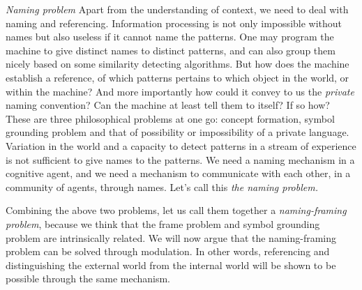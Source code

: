 {{{{{\emph{Naming problem} Apart from the understanding of context, we need to deal with naming and referencing. Information processing is not only impossible without names but also useless if it cannot name the patterns. One may program the machine to give distinct names to distinct patterns, and can also group them nicely based on some similarity detecting algorithms. But how does the machine establish a reference, of which patterns pertains to which object in the world, or within the machine? And more importantly how could it convey to us the \textit{private} naming convention?  Can the machine at least tell them to itself?  If so how? These are three philosophical problems at one go: concept formation, symbol grounding problem and that of possibility or impossibility of a private language. Variation in the world and a capacity to detect patterns in a stream of experience is not sufficient to give names to the patterns. We need a naming mechanism in a cognitive agent, and we need a mechanism to communicate with each other, in a community of agents, through names. Let's call this \textit{the naming problem.} 

Combining the above two problems, let us call them together a \textit{naming-framing problem}, because we think that the frame problem and symbol grounding problem are intrinsically related. 
We will now argue that the naming-framing problem can be solved through modulation. In other words, referencing and distinguishing the external world from the internal world will be shown to be possible through the same mechanism. 

}}}}}
